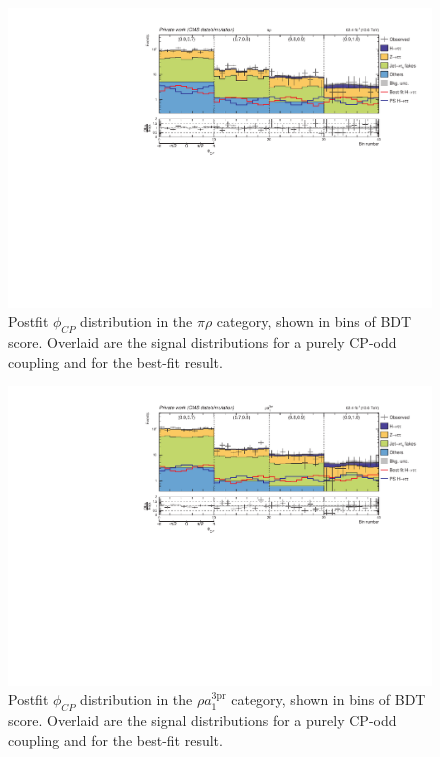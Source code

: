 \begin{figure}[!htbp]
    \centering
    \includegraphics[width=1\textwidth]{Figures/Chapter7/postfit/htt_tt_7_13p6TeV.pdf}
    \caption[Postfit $\phi_{CP}$ distribution in the $\pi\rho$ category.]
    {Postfit $\phi_{CP}$ distribution in the $\pi\rho$ category, shown in bins of \ac{BDT} score. Overlaid are the signal distributions for a purely CP-odd coupling and for the best-fit result.}
    \label{Figure:Chapter7_Postfit_Unrolled_2}
\end{figure}

\begin{figure}[!htbp]
    \centering
    \includegraphics[width=1\textwidth]{Figures/Chapter7/postfit/htt_tt_5_13p6TeV.pdf}
    \caption[Postfit $\phi_{CP}$ distribution in the $\rho a_1^\text{3pr}$ category.]
    {Postfit $\phi_{CP}$ distribution in the $\rho a_1^\text{3pr}$ category, shown in bins of \ac{BDT} score. Overlaid are the signal distributions for a purely CP-odd coupling and for the best-fit result.}
    \label{Figure:Chapter7_Postfit_Unrolled_3}
\end{figure}

